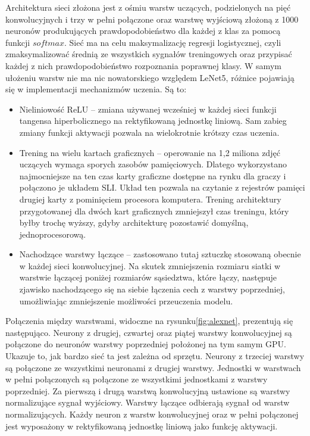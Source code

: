 \documentclass[12pt,a4paper,twoside,titlepage,openright]{book}
\begin{document}
 Architektura sieci złożona jest z ośmiu warstw uczących, podzielonych na pięć konwolucyjnych i trzy w pełni połączone oraz warstwę wyjściową złożoną z 1000 neuronów produkujących prawdopodobieństwo dla każdej z klas za pomocą funkcji $softmax$. Sieć ma na celu maksymalizację regresji logistycznej, czyli zmaksymalizować średnią ze wszystkich sygnałów treningowych oraz przypisać każdej z nich prawdopodobieństwo rozpoznania poprawnej klasy.
  W samym ułożeniu warstw nie ma nic nowatorskiego względem LeNet5, różnice pojawiają się w implementacji mechanizmów uczenia. Są to:
 \begin{itemize}
 \item Nieliniowość ReLU -- zmiana używanej wcześniej w każdej sieci funkcji tangensa hiperbolicznego na rektyfikowaną jednostkę liniową. Sam zabieg zmiany funkcji aktywacji pozwala na wielokrotnie krótszy czas uczenia.
 \item Trening na wielu kartach graficznych -- operowanie na 1,2 miliona zdjęć uczących wymaga sporych zasobów pamięciowych. Dlatego wykorzystano najmocniejsze na ten czas karty graficzne dostępne na rynku dla graczy i połączono je układem SLI. Układ ten pozwala na czytanie z rejestrów pamięci drugiej karty z pominięciem procesora komputera. Trening architektury przygotowanej dla dwóch kart graficznych zmniejszył czas treningu, który byłby trochę wyższy, gdyby architekturę pozostawić domyślną, jednoprocesorową.
 \item Nachodzące warstwy łączące -- zastosowano tutaj sztuczkę stosowaną obecnie w każdej sieci konwolucyjnej. Na skutek zmniejszenia rozmiaru siatki w warstwie łączącej poniżej rozmiarów sąsiedztwa, które łączy, następuje zjawisko nachodzącego się na siebie łączenia cech z warstwy poprzedniej, umożliwiając zmniejszenie możliwości przeuczenia modelu.
 \end{itemize}
 
 Połączenia między warstwami, widoczne na rysunku\ref{fig:alexnet}, prezentują się następująco. Neurony z drugiej, czwartej oraz piątej warstwy konwolucyjnej są połączone do neuronów warstwy poprzedniej położonej na tym samym GPU. Ukazuje to, jak bardzo sieć ta jest zależna od sprzętu. Neurony z trzeciej warstwy są połączone ze wszystkimi neuronami z drugiej warstwy. Jednostki w warstwach w pełni połączonych są połączone ze wszystkimi jednostkami z warstwy poprzedniej. Za pierwszą i drugą warstwą konwolucyjną ustawione są warstwy normalizujące sygnał wyjściowy. Warstwy łączące odbierają sygnał od warstw normalizujących. Każdy neuron z warstw konwolucyjnej oraz w pełni połączonej jest wyposażony w rektyfikowaną jednostkę liniową jako funkcję aktywacji.
\end{document}
